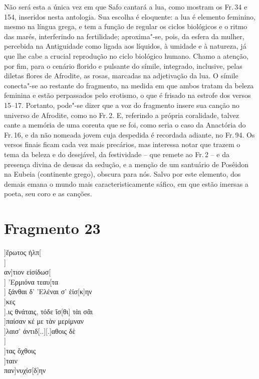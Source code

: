 {Não será esta a única vez em que Safo cantará a lua,
como mostram os Fr.\,34 e 154, inseridos nesta antologia. Sua escolha é
eloquente: a lua é elemento feminino, mesmo na língua grega, e tem a função de
regular os ciclos biológicos e o ritmo das marés, interferindo na fertilidade;
aproxima"-se, pois, da esfera da mulher, percebida na Antiguidade como ligada
aos líquidos, à umidade e à natureza, já que lhe cabe a crucial
reprodução no ciclo biológico humano. Chamo a atenção, por fim, para o cenário
florido e pulsante do símile, integrado, inclusive, pelas diletas flores de
Afrodite, as rosas, marcadas na adjetivação da lua. O símile conecta"-se
ao restante do fragmento, na medida em que ambos tratam da beleza feminina e
estão perpassados pelo erotismo, o que é frisado na estrofe dos versos 15--17.
Portanto, pode"-se dizer que a voz do fragmento insere sua canção no universo de
Afrodite, como no Fr.\,2.
E, referindo a própria coralidade, talvez cante a memória de uma coreuta que se foi, como seria o caso da Anactória do Fr.\,16, e da não nomeada jovem cuja despedida é recordada adiante, no Fr.\,94.
Os versos finais ficam cada vez mais precários, mas interessa notar que trazem o tema da beleza e do desejável, da festividade -- que remete ao Fr.\,2 -- e da presença divina de deusas da sedução, e a menção de um santuário de Posêidon na Eubeia (continente grego), obscura para nós. Salvo por este elemento, dos demais emana o mundo mais caracteristicamente sáfico, em que estão imersas a poeta, seu coro e as canções.}

\pagebreak
\section{Fragmento 23}

\begin{gkverse}
]ἕρωτος  ἠλπ[\\
		       ]\\
		   αν]τιον εἰσίδωσ[\\
		       ] ’Ερμιόνα τεαυ[τα\\
	   ] ξάνθαι δ’ ’Ελέναι σ’ ἑίσ[κ]ην\\
	]κες \\
	].ις θνάταις, τόδε ἴσ[θι] τὰι σᾶι\\
	]παίσαν κέ με τὰν μερίμναν\\
	]λαισ’ ἀντιδ[..][.]αθοις δὲ\\
     ]\\
				]τας ὄχθοις\\
			          ]ταιν\\
			      παν]νυχίσ[δ]ην
\end{gkverse}


